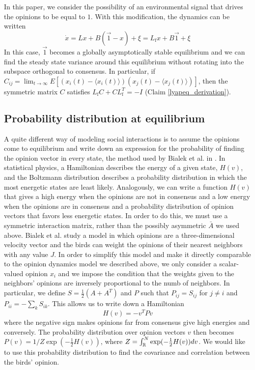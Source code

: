 \documentclass{article}
\begin{document}
In this paper, we consider the possibility of an environmental signal that drives the opinions to be equal to $1$. With this modification, the dynamics can be written
\begin{equation}
\dot{x}=Lx+B(\vec{1}-x)+\xi=L_\text{f}x+B\vec{1}+\xi
\end{equation}
In this case, $\vec{1}$ becomes a globally asymptotically stable equilibrium and we can find the steady state variance around this equilibrium without rotating into the subspace orthogonal to consensus. In particular, if $C_{ij}=\lim_{t\to\infty}E[(x_i(t)-\langle x_i(t)\rangle)(x_j(t)-\langle x_j(t)\rangle)]$, then the symmetric matrix $C$ satisfies $L_\text{f}C+CL_\text{f}^T=-I$ (Claim \ref{lyapeq_derivation}).

\subsection{Probability distribution at equilibrium }
A quite different way of modeling social interactions is to assume the opinions come to equilibrium and write down an expression for the probability of finding the opinion vector in every state, the method used by Bialek et al. in \cite{Bialek:2012fk}. In statistical physics, a Hamiltonian describes the energy of a given state, $H(v)$, and the Boltzmann distribution describes a probability distribution in which the most energetic states are least likely. Analogously, we can write a function $H(v)$ that gives a high energy when the opinions are not in consensus and a low energy when the opinions are in consensus and a probability distribution of opinion vectors that favors less energetic states. In order to do this, we must use a symmetric interaction matrix, rather than the possibly asymmetric $\bar{A}$ we used above. Bialek et al. study a model in which opinions are a three-dimensional velocity vector and the birds can weight the opinions of their nearest neighbors with any value $J$. In order to simplify this model and make it directly comparable to the opinion dynamics model we described above, we only consider a scalar-valued opinion $x_i$ and we impose the condition that the weights given to the neighbors' opinions are inversely proportional to the numb of neighbors. In particular, we define $S=\frac{1}{2}(A+A^T)$ and $P$ such that $P_{ij}=S_{ij}$ for $j\neq i$ and $P_{ii}=-\sum_kS_{ik}$. This allows us to write down a Hamiltonian
\begin{equation}
H(v)=-v^TPv
\end{equation}
where the negative sign makes opinions far from consensus give high energies and conversely. The probability distribution over opinion vectors $v$ then becomes $P(v)=1/Z\exp(-\frac{1}{2}H(v))$, where $Z=\int_{\mathbb{R}}^N\exp(-\frac{1}{2}H(v))dv$. We would like to use this probability distribution to find the covariance and correlation between the birds' opinion. 
\end{document}
